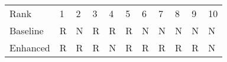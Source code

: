 \begin{tabular}{lllllllllll}
Rank & 1 & 2 & 3 & 4 & 5 & 6 & 7 & 8 & 9 & 10 \\
Baseline & R & N & R & R & R & N & N & N & N & N \\
Enhanced & R & R & R & N & R & R & R & R & R & N \\
\end{tabular}
